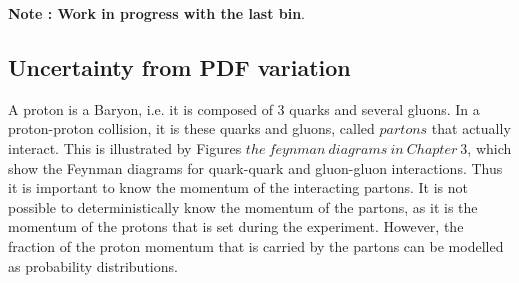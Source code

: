 \documentclass[11pt,a4paper,openright,twoside]{report}
\begin{document}
\textbf{Note : Work in progress with the last bin}.

\subsection{Uncertainty from PDF variation}
A proton is a Baryon, i.e. it is composed of 3 quarks and several gluons. In a proton-proton collision, it is these quarks and gluons, called $partons$ that actually interact. This is illustrated by Figures $the\ feynman\ diagrams\ in\ Chapter\ 3$, which show the Feynman diagrams for quark-quark and gluon-gluon interactions. Thus it is important to know the momentum of the interacting partons. It is not possible to deterministically know the momentum of the partons, as it is the momentum of the protons that is set during the experiment. However, the fraction of the proton momentum that is carried by the partons can be modelled as probability distributions.
\end{document}

